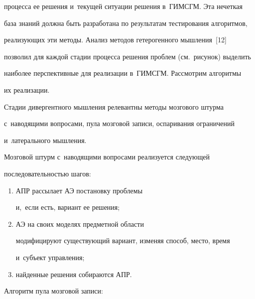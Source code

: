 процесса ее решения и~текущей ситуации решения в~ГИМСГМ. Эта нечеткая 


база знаний должна быть разработана по результатам тестирования алгоритмов, 


реализующих эти методы. Анализ методов гетерогенного мышления~[12] 


позволил для каждой стадии процесса решения проблем (см.\ рисунок) выделить 


наиболее перспективные для реализации в~ГИМСГМ. Рассмотрим алгоритмы 


их реализации.


  


  Стадии дивергентного мышления релевантны методы мозгового штурма 


с~наводящими вопросами, пула мозговой записи, оспаривания ограничений 


и~латерального мышления.


  


  Мозговой штурм с~наводящими вопросами реализуется следующей 


последовательностью шагов: 


\begin{enumerate}[(1)]


\item АПР рассылает АЭ постановку проблемы 


и,~если есть, вариант ее решения;\\[-10pt] 


\item АЭ на своих моделях предметной области 


модифицируют существующий вариант, изменяя способ, место, время 


и~субъект управления; \\[-10pt] 


\item найденные решения собираются АПР.


\end{enumerate}


  


  Алгоритм пула мозговой записи: 


